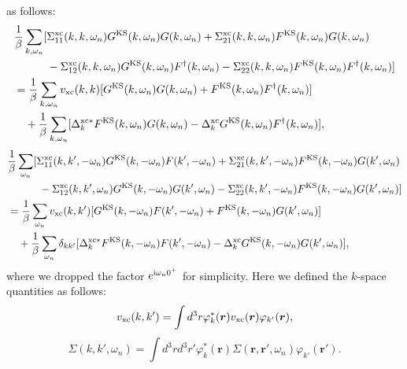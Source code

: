 as follows:
%
\begin{equation}
	\begin{split}
	& \frac{1}{\beta} \sum_{k,\omega_n} [\Sigma^{\rm xc}_{11}(k,k,\omega_n)
	  G^{\rm KS}(k,\omega_n)G(k,\omega_n) + \Sigma^{\rm xc}_{21}(k,k,\omega_n)
	  F^{\rm KS}(k,\omega_n)G(k,\omega_n) \\
  	&\quad \quad \quad - \Sigma^{\rm xc}_{12}(k,k,\omega_n)G^{\rm KS}(k,\omega_n)F^{\dag}(k,\omega_n)
	- \Sigma^{\rm xc}_{22}(k,k,\omega_n)F^{\rm KS}(k,\omega_n)F^{\dag}(k,\omega_n)] \\
	& = \frac{1}{\beta}\sum_{k, \omega_n} v_{\rm xc}(k,k)
	[G^{\rm KS}(k,\omega_n)G(k,\omega_n) + F^{\rm KS}(k,\omega_n)F^{\dag}(k,\omega_n)] \\
	&\quad + \frac{1}{\beta} \sum_{k,\omega_n}[\Delta^{\rm xc\ast}_{k}
		F^{\rm KS}(k, \omega_n)G(k, \omega_n) - \Delta^{\rm xc}_{k}G^{\rm KS}(k,\omega_n)
	F^{\dag}(k,\omega_n)],
	\label{eq:11comp2}
\end{split}
\end{equation}
%
\begin{equation}
	\begin{split}
	& \frac{1}{\beta} \sum_{\omega_n} [\Sigma^{\rm xc}_{11}(k,k',-\omega_n)
	  G^{\rm KS}(k,-\omega_n)F(k',-\omega_n) + \Sigma^{\rm xc}_{21}(k,k',-\omega_n)
	  F^{\rm KS}(k,-\omega_n)G(k',\omega_n) \\
  	&\quad \quad \quad - \Sigma^{\rm xc}_{12}(k,k',\omega_n)G^{\rm KS}(k,-\omega_n)G(k',\omega_n)
	- \Sigma^{\rm xc}_{22}(k,k',-\omega_n)F^{\rm KS}(k,-\omega_n)G(k',\omega_n)] \\
	& = \frac{1}{\beta}\sum_{\omega_n} v_{\rm xc}(k,k')
	[G^{\rm KS}(k,-\omega_n)F(k',-\omega_n) + F^{\rm KS}(k,-\omega_n)G(k',\omega_n)] \\
	&\quad + \frac{1}{\beta} \sum_{\omega_n}\delta_{kk'}[\Delta^{\rm xc\ast}_{k}
		F^{\rm KS}(k, -\omega_n)F(k', -\omega_n) - \Delta^{\rm xc}_{k}G^{\rm KS}(k,-\omega_n)
	G(k',\omega_n)],
	\label{eq:12comp2}
\end{split}
\end{equation}
where we dropped the factor $e^{ {\rm i}\omega_n0^{+}}$ for simplicity. 
Here we defined the $k$-space quantities as follows:
%
\begin{equation}
	v_{\rm xc}(k,k') = \int d^3r \varphi^{\ast}_{k}(\bm r)v_{\rm xc}(\bm r)\varphi_{k'}(\bm r),
	\label{eq:vxckk}
\end{equation}
%
\begin{equation}
	\Sigma(k,k',\omega_n) = \int d^3r d^3r' \varphi^{\ast}_{k}(\bm r)
	\Sigma(\bm r,\bm r',\omega_n)\varphi_{k'}(\bm r').
	\label{eq:Sigmakk}
\end{equation}
